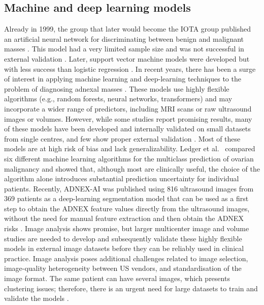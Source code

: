 \subsection{Machine and deep learning models}

Already in 1999, the group that later would become the \gls{IOTA} group published an artificial neural network for discriminating between benign and malignant masses \cite{timmermanArtificialNeuralNetwork1999}. This model had a very limited sample size and was not successful in external validation \cite{vanholsbekeExternalValidationMathematical2007}. Later, support vector machine models were developed but with less success than logistic regression \cite{vancalster2008predictive}. In recent years, there has been a surge of interest in applying machine learning and deep-learning techniques to the problem of diagnosing adnexal masses \cite{luUsingMachineLearning2020, geyselsArtificialIntelligenceApplied2025}. These models use highly flexible algorithms (e.g., random forests, neural networks, transformers) and may incorporate a wider range of predictors, including MRI scans or raw ultrasound images or volumes. However, while some studies report promising results, many of these models have been developed and internally validated on small datasets from single centres, and few show proper external validation \cite{geyselsArtificialIntelligenceApplied2025}. Most of these models are at high risk of bias and lack generalizability. Ledger et al.\ \cite{ledgerMulticlassRiskModels2023} compared six different machine learning algorithms for the multiclass prediction of ovarian malignancy and showed that, although most are clinically useful, the choice of the algorithm alone introduces substantial prediction uncertainty for individual patients. Recently, ADNEX-AI was published using 816 ultrasound images from 369 patients as a deep-learning segmentation model that can be used as a first step to obtain the ADNEX feature values directly from the ultrasound images, without the need for manual feature extraction and then obtain the ADNEX risks \cite{geyselsADNEXAIAutomatedExtraction2025}. Image analysis shows promise, but larger multicenter image and volume studies are needed to develop and subsequently validate these highly flexible models in external image datasets before they can be reliably used in clinical practice. Image analysis poses additional challenges related to image selection, image-quality heterogeneity between \gls{US} vendors, and standardisation of the image format. The same patient can have several images, which presents clustering issues; therefore, there is an urgent need for large datasets to train and validate the models \cite{geyselsArtificialIntelligenceApplied2025}.   

